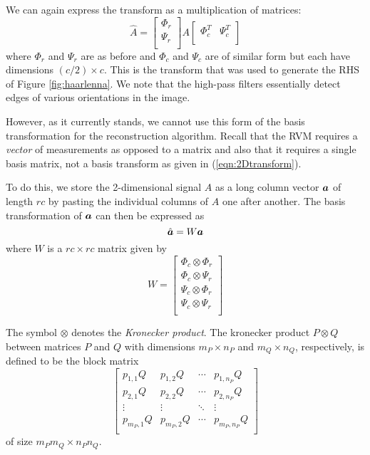 We can again express the transform as a multiplication of matrices:
\begin{equation}
\label{eqn:2Dtransform}
\hat A = \begin{bmatrix}
  \Phi_r\\
  \Psi_r\\
\end{bmatrix}
A
\begin{bmatrix}
  \Phi_c^T & \Psi_c^T\\
\end{bmatrix}
\end{equation}
where $\Phi_r$ and $\Psi_r$ are as before and $\Phi_c$ and $\Psi_c$ are of similar form but each have dimensions $(c/2)\times c$.
This is the transform that was used to generate the RHS of Figure \ref{fig:haarlenna}.
We note that the high-pass filters essentially detect edges of various orientations in the image.

However, as it currently stands, we cannot use this form of the basis transformation for the reconstruction algorithm. Recall that the RVM requires a \emph{vector} of measurements as opposed to a matrix and also that it requires a single basis matrix, not a basis transform as given in (\ref{eqn:2Dtransform}).

To do this, we store the 2-dimensional signal $A$ as a long column vector $\boldsymbol a$ of length $rc$ by pasting the individual columns of $A$ one after another.
The basis transformation of $\boldsymbol a$ can then be expressed as 
\begin{equation*}
\hat{\boldsymbol a} = W \boldsymbol a
\end{equation*}
where $W$ is a $rc \times rc $ matrix given by
\begin{equation*}
W = 
\begin{bmatrix}
\Phi_c \otimes \Phi_r \\
\Phi_c \otimes \Psi_r \\
\Psi_c \otimes \Phi_r \\
\Psi_c \otimes \Psi_r \\
\end{bmatrix}
\end{equation*}

The symbol $\otimes$ denotes the \emph{Kronecker product}. 
The kronecker product $P \otimes Q$ between matrices $P$ and $Q$ with dimensions $m_P \times n_P$ and $m_Q \times n_Q$, respectively,  is defined to be the block matrix
\begin{equation*}
\begin{bmatrix}
p_{1,1} Q & p_{1,2} Q & \cdots & p_{1,n_P} Q \\
p_{2,1} Q & p_{2,2} Q & \cdots & p_{2,n_P} Q \\
\vdots&\vdots&\ddots&\vdots \\
p_{m_P,1} Q & p_{m_P,2} Q & \cdots & p_{m_P,n_P} Q \\
\end{bmatrix}
\end{equation*}
of size $m_Pm_Q \times n_Pn_Q$.

